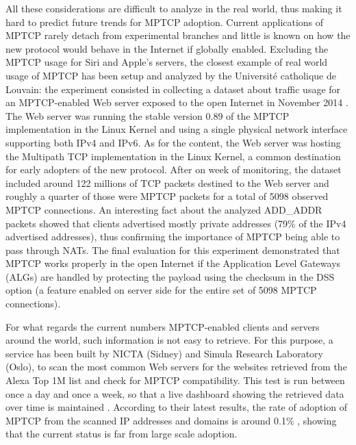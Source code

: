 All these considerations are difficult to analyze in the real world, thus making it hard to predict future trends for MPTCP adoption. Current applications of MPTCP rarely detach from experimental branches and little is known on how the new protocol would behave in the Internet if globally enabled. Excluding the MPTCP usage for Siri and Apple's servers, the closest example of real world usage of MPTCP has been setup and analyzed by the Université catholique de Louvain: the experiment consisted in collecting a dataset about traffic usage for an MPTCP-enabled Web server exposed to the open Internet in November 2014 \cite{HTSB15}. The Web server was running the stable version 0.89 of the MPTCP implementation in the Linux Kernel and using a single physical network interface supporting both IPv4 and IPv6. As for the content, the Web server was hosting the Multipath TCP implementation in the Linux Kernel, a common destination for early adopters of the new protocol. After on week of monitoring, the dataset included around 122 millions of TCP packets destined to the Web server and roughly a quarter of those were MPTCP packets for a total of 5098 observed MPTCP connections. 
An interesting fact about the analyzed ADD\_ADDR packets showed that clients advertised mostly private addresses (79\% of the IPv4 advertised addresses), thus confirming the importance of MPTCP being able to pass through NATs. 
The final evaluation for this experiment demonstrated that MPTCP works properly in the open Internet if the Application Level Gateways (ALGs) are handled by protecting the payload using the checksum in the DSS option (a feature enabled on server side for the entire set of 5098 MPTCP connections).

For what regards the current numbers MPTCP-enabled clients and servers around the world, such information is not easy to retrieve. For this purpose, a service has been built by NICTA (Sidney) and Simula Research Laboratory (Oslo), to scan the most common Web servers for the websites retrieved from the Alexa Top 1M list and check for MPTCP compatibility. This test is run between once a day and once a week, so that a live dashboard showing the retrieved data over time is maintained \cite{dashboard}. According to their latest results, the rate of adoption of MPTCP from the scanned IP addresses and domains is around 0.1\% \cite{Mehani:2015:ELM:2798087.2798088}, showing that the current status is far from large scale adoption.